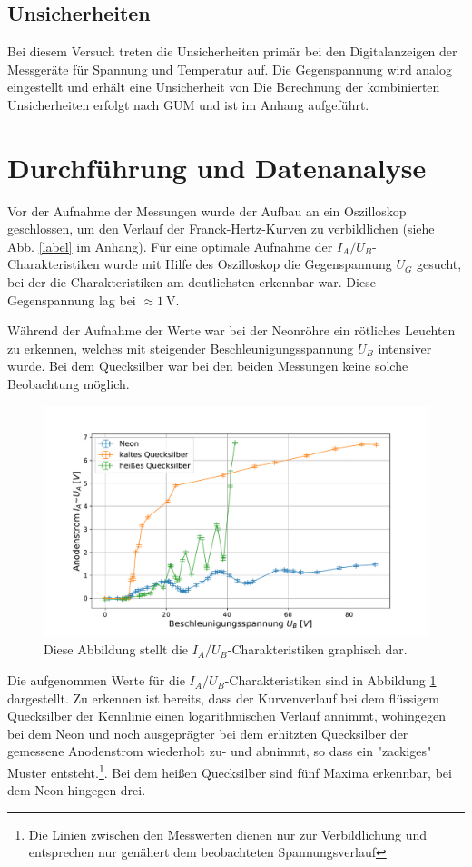 	\subsection{Unsicherheiten} 
	
		Bei diesem Versuch treten die Unsicherheiten primär bei den Digitalanzeigen der Messgeräte für Spannung und Temperatur auf. 
		Die Gegenspannung wird analog eingestellt und erhält eine Unsicherheit von %
		Die Berechnung der kombinierten Unsicherheiten erfolgt nach GUM und ist im Anhang aufgeführt.

\section{Durchführung und Datenanalyse}
	
	Vor der Aufnahme der Messungen wurde der Aufbau an ein Oszilloskop geschlossen, um den Verlauf der Franck-Hertz-Kurven zu verbildlichen (siehe Abb. \ref{label} im Anhang). 
	Für eine optimale Aufnahme der $I_A/U_B$-Charakteristiken wurde mit Hilfe des Oszilloskop die Gegenspannung $U_G$ gesucht, bei der die Charakteristiken am deutlichsten erkennbar war.
	Diese Gegenspannung lag bei $\approx \SI{1}{\volt}$.
	
	Während der Aufnahme der Werte war bei der Neonröhre ein rötliches Leuchten zu erkennen, welches mit steigender Beschleunigungsspannung $U_B$ intensiver wurde.  
	Bei dem Quecksilber war bei den beiden Messungen keine solche Beobachtung möglich.
	
	\begin{figure}[ht]
		\centering
		\includegraphics[width=\textwidth]{data/CharakteristikZusammen.pdf}
		\caption{Diese Abbildung stellt die $I_A/U_B$-Charakteristiken graphisch dar.}
		\label{fig:Kurve}	
	\end{figure}
	Die aufgenommen Werte für die $I_A/U_B$-Charakteristiken sind in Abbildung \ref{fig:Kurve} dargestellt. 
	Zu erkennen ist bereits, dass der Kurvenverlauf bei dem flüssigem Quecksilber der Kennlinie einen logarithmischen Verlauf annimmt, wohingegen bei dem Neon und noch ausgeprägter bei dem erhitzten Quecksilber der gemessene Anodenstrom wiederholt zu- und abnimmt, so dass ein "zackiges" Muster entsteht.\footnote{Die Linien zwischen den Messwerten dienen nur zur Verbildlichung und entsprechen nur genähert dem beobachteten Spannungsverlauf}. 
	Bei dem heißen Quecksilber sind fünf Maxima erkennbar, bei dem Neon hingegen drei.
	

